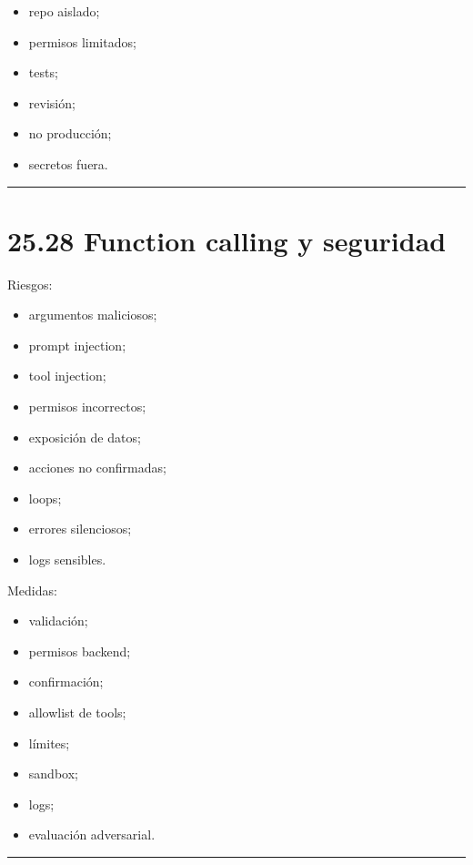 \begin{itemize}
\tightlist
\item
  repo aislado;
\item
  permisos limitados;
\item
  tests;
\item
  revisión;
\item
  no producción;
\item
  secretos fuera.
\end{itemize}

\begin{center}\rule{0.5\linewidth}{0.5pt}\end{center}

\section{25.28 Function calling y
seguridad}\label{function-calling-y-seguridad}

Riesgos:

\begin{itemize}
\tightlist
\item
  argumentos maliciosos;
\item
  prompt injection;
\item
  tool injection;
\item
  permisos incorrectos;
\item
  exposición de datos;
\item
  acciones no confirmadas;
\item
  loops;
\item
  errores silenciosos;
\item
  logs sensibles.
\end{itemize}

Medidas:

\begin{itemize}
\tightlist
\item
  validación;
\item
  permisos backend;
\item
  confirmación;
\item
  allowlist de tools;
\item
  límites;
\item
  sandbox;
\item
  logs;
\item
  evaluación adversarial.
\end{itemize}

\begin{center}\rule{0.5\linewidth}{0.5pt}\end{center}

